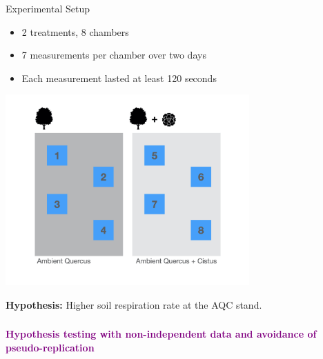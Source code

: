 \documentclass{beamer}
\begin{document}
\begin{frame}{Experimental Setup}
  \begin{itemize}
    \item 2 treatments, 8 chambers
    \item 7 measurements per chamber over two days
    \item Each measurement lasted at least 120 seconds
  \end{itemize}

  \begin{center}
    \includegraphics[width=0.7\textwidth]{lectures/day_1_intro_to_mems/figures/respiration.jpeg}
  \end{center}

\textbf{Hypothesis:} Higher soil respiration rate at the AQC stand.
\end{frame}

\begin{frame}
  \frametitle{}
  \begin{center}
    \huge\textbf{\textcolor{purple}{Hypothesis testing with non-independent data and avoidance of pseudo-replication}}
  \end{center}
\end{frame}
\end{document}

